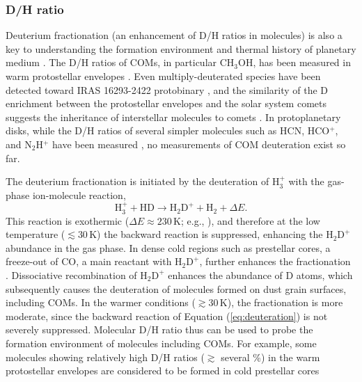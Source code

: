 \documentclass[linenumbers, twocolumn, twocolappendix, astrosymb, times]{aastex631}
\newcommand{\methanol}{CH$_3$OH\xspace}
\begin{document}
\subsubsection{D/H ratio}
Deuterium fractionation (an enhancement of D/H ratios in molecules) is also a key to understanding the formation environment and thermal history of planetary medium \citep[e.g.,][]{Ceccarelli2014, Nomura2023_PPVII}. The D/H ratios of COMs, in particular \methanol, has been measured in warm protostellar envelopes \citep[e.g.,][]{Jorgensen2018, Drozdovskaya2021}. Even multiply-deuterated species have been detected toward IRAS 16293-2422 protobinary \citep[e.g.,][]{Manigand2019, Richard2021, Drozdovskaya2022}, and the similarity of the D enrichment between the protostellar envelopes and the solar system comets suggests the inheritance of interstellar molecules to comets \citep{Drozdovskaya2021}. In protoplanetary disks, while the D/H ratios of several simpler molecules such as HCN, HCO$^{+}$, and N$_2$H$^{+}$ have been measured \citep[e.g.,][see also \citealt{Aikawa2022}]{Cataldi2021}, no measurements of COM deuteration exist so far. 


The deuterium fractionation is initiated by the deuteration of $\mathrm{H_3^+}$ with the gas-phase ion-molecule reaction, 
\begin{equation}\label{eq:deuteration}
    \mathrm{H}_3^+ + \mathrm{HD} \rightarrow \mathrm{H_2D^+} + \mathrm{H_2} + \Delta E.
\end{equation}
This reaction is exothermic ($\Delta E \approx 230$\,K; e.g., \citealt{Millar1989}), and therefore at the low temperature ($\lesssim 30$\,K) the backward reaction is suppressed, enhancing the $\mathrm{H_2D^+}$ abundance in the gas phase. In dense cold regions such as prestellar cores, a freeze-out of CO, a main reactant with $\mathrm{H_2D^+}$, further enhances the fractionation \citep[e.g.,][]{Roberts2000}. Dissociative recombination of $\mathrm{H_2D^+}$ enhances the abundance of D atoms, which subsequently causes the deuteration of molecules formed on dust grain surfaces, including COMs. In the warmer conditions ($\gtrsim 30$\,K), the fractionation is more moderate, since the backward reaction of Equation (\ref{eq:deuteration}) is not severely suppressed. Molecular D/H ratio thus can be used to probe the formation environment of molecules including COMs. For example, some molecules showing relatively high D/H ratios ($\gtrsim$ several \%) in the warm protostellar envelopes are considered to be formed in cold prestellar cores \citep[e.g.,][]{Jorgensen2018, Yamato2022}
\end{document}
